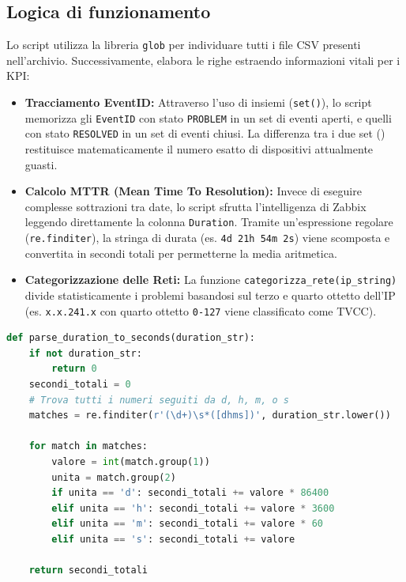 \documentclass[12pt, a4paper]{report}
\newcommand{\inlinecode}[1]{\colorbox{backcolour}{\texttt{\detokenize{#1}}}}%
\begin{document}
\subsection{Logica di funzionamento}
Lo script utilizza la libreria \texttt{glob} per individuare tutti i file CSV presenti nell'archivio. Successivamente, elabora le righe estraendo informazioni vitali per i KPI:
\begin{itemize}
    \item \textbf{Tracciamento EventID:} Attraverso l'uso di insiemi (\texttt{set()}), lo script memorizza gli \texttt{EventID} con stato \texttt{PROBLEM} in un set di eventi aperti, e quelli con stato \texttt{RESOLVED} in un set di eventi chiusi. La differenza tra i due set (\inlinecode{eventi_aperti - eventi_chiusi}) restituisce matematicamente il numero esatto di dispositivi attualmente guasti.
    \item \textbf{Calcolo MTTR (Mean Time To Resolution):} Invece di eseguire complesse sottrazioni tra date, lo script sfrutta l'intelligenza di Zabbix leggendo direttamente la colonna \texttt{Duration}. Tramite un'espressione regolare (\texttt{re.finditer}), la stringa di durata (es. \texttt{4d 21h 54m 2s}) viene scomposta e convertita in secondi totali per permetterne la media aritmetica.
    \item \textbf{Categorizzazione delle Reti:} La funzione \texttt{categorizza\_rete(ip\_string)} divide statisticamente i problemi basandosi sul terzo e quarto ottetto dell'IP (es. \texttt{x.x.241.x} con quarto ottetto \texttt{0-127} viene classificato come TVCC).
\end{itemize}

\begin{lstlisting}[language=Python, caption=Estrazione dei secondi dalla colonna Duration tramite Regex]
def parse_duration_to_seconds(duration_str):
    if not duration_str:
        return 0
    secondi_totali = 0
    # Trova tutti i numeri seguiti da d, h, m, o s
    matches = re.finditer(r'(\d+)\s*([dhms])', duration_str.lower())
    
    for match in matches:
        valore = int(match.group(1))
        unita = match.group(2)
        if unita == 'd': secondi_totali += valore * 86400
        elif unita == 'h': secondi_totali += valore * 3600
        elif unita == 'm': secondi_totali += valore * 60
        elif unita == 's': secondi_totali += valore
            
    return secondi_totali
\end{lstlisting}
\end{document}
